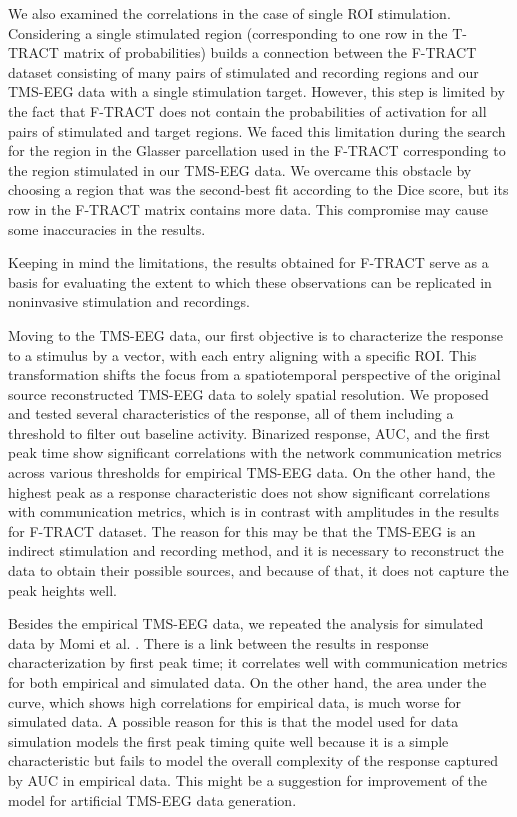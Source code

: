We also examined the correlations in the case of single ROI stimulation. Considering a single stimulated region (corresponding to one row in the T-TRACT matrix of probabilities) builds a connection between the F-TRACT dataset consisting of many pairs of stimulated and recording regions and our TMS-EEG data with a single stimulation target. However, this step is limited by the fact that F-TRACT does not contain the probabilities of activation for all pairs of stimulated and target regions. We faced this limitation during the search for the region in the Glasser parcellation used in the F-TRACT corresponding to the region stimulated in our TMS-EEG data. We overcame this obstacle by choosing a region that was the second-best fit according to the Dice score, but its row in the F-TRACT matrix contains more data. This compromise may cause some inaccuracies in the results.

Keeping in mind the limitations, the results obtained for F-TRACT serve as a basis for evaluating the extent to which these observations can be replicated in noninvasive stimulation and recordings. 

Moving to the TMS-EEG data, our first objective is to characterize the response to a stimulus by a vector, with each entry aligning with a specific ROI. This transformation shifts the focus from a spatiotemporal perspective of the original source reconstructed TMS-EEG data to solely spatial resolution. We proposed and tested several characteristics of the response, all of them including a threshold to filter out baseline activity. Binarized response, AUC, and the first peak time show significant correlations with the network communication metrics across various thresholds for empirical TMS-EEG data. On the other hand, the highest peak as a response characteristic does not show significant correlations with communication metrics, which is in contrast with amplitudes in the results for F-TRACT dataset. The reason for this may be that the TMS-EEG is an indirect stimulation and recording method, and it is necessary to reconstruct the data to obtain their possible sources, and because of that, it does not capture the peak heights well.

Besides the empirical TMS-EEG data, we repeated the analysis for simulated data by Momi et al. \cite{momi_tms-evoked_2023}. There is a link between the results in response characterization by first peak time; it correlates well with communication metrics for both empirical and simulated data. On the other hand, the area under the curve, which shows high correlations for empirical data, is much worse for simulated data. A possible reason for this is that the model used for data simulation models the first peak timing quite well because it is a simple characteristic but fails to model the overall complexity of the response captured by AUC in empirical data. This might be a suggestion for improvement of the model for artificial TMS-EEG data generation.

